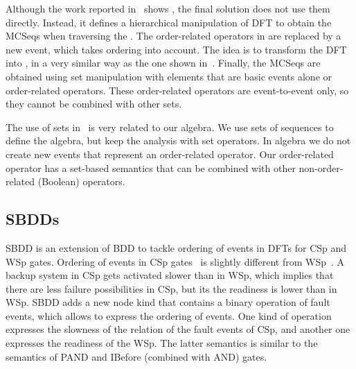 \documentclass[12pt,openright,twoside,a4paper,oldfontcommands,english,brazil,final]{abntex2}
\theoremstyle{theo}
\begin{document}
Although the work reported in~\cite{TD2004} shows , the final solution does not use them directly. Instead, it defines a hierarchical manipulation of \ac{DFT} to obtain the \acp{MCSeq} when traversing the .
The order-related operators in  are replaced by a new event, which takes ordering into account.
The idea is to transform the \ac{DFT} into , in a very similar way as the one shown in~\cite{TXD2011}.
Finally, the \acp{MCSeq} are obtained using set manipulation with elements that are basic events alone or order-related operators.
These order-related operators are event-to-event only, so they cannot be combined with other sets.

The use of sets in~\cite{TD2004} is very related to our \ac{algebra}.
We use sets of sequences to define the \ac{algebra}, but keep the analysis with set operators.
In \ac{algebra} we do not create new events that represent an order-related operator.
Our order-related operator has a set-based semantics that can be combined with other non-order-related (Boolean) operators.

\subsection{\Aclp*{SBDD}}
\label{sec:sbdd}

\Ac{SBDD} is an extension of \ac{BDD} to tackle ordering of events in \acp{DFT} for \ac{CSp} and \ac{WSp} gates.
Ordering of events in \ac{CSp} gates~\cite{XTD2012} is slightly different from \ac{WSp}~\cite{TXD2011}.
A backup system in \ac{CSp} gets activated slower than in \ac{WSp}, which implies that there are less failure possibilities in \ac{CSp}, but its the readiness is lower than in \ac{WSp}.
\Ac{SBDD} adds a new node kind that contains a binary operation of fault events, which allows to express the ordering of events.
One kind of operation expresses the slowness of the relation of the fault events of \ac{CSp}, and another one expresses the readiness of the \ac{WSp}.
The latter semantics is similar to the semantics of \ac{PAND} and \ac{IBefore} (combined with \ac{AND}) gates.
\end{document}
